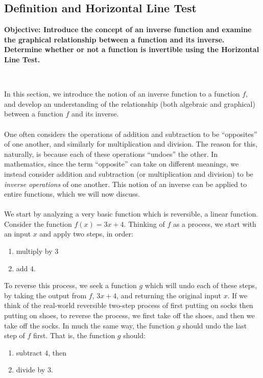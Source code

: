 \documentclass[11pt]{book}
\newcommand{\tmstrong}[1]{\textbf{#1}}
\theoremstyle{definition}  %
\newcommand{\pp}{\par~\par}
\begin{document}
\subsection{Definition and Horizontal Line Test}

{\tmstrong{Objective: Introduce the concept of an inverse function and examine the graphical relationship between a function and its inverse.  Determine whether or not a function is invertible using the Horizontal Line Test.}}\pp

In this section, we introduce the notion of an inverse function to a function $f$, and develop an understanding of the relationship (both algebraic and graphical) between a function $f$ and its inverse.\\
~\\
One often considers the operations of addition and subtraction to be ``opposites'' of one another, and similarly for multiplication and division.  The reason for this, naturally, is because each of these operations ``undoes'' the other.  In mathematics, since the term ``opposite'' can take on different meanings, we instead consider addition and subtraction (or multiplication and division) to be \textit{inverse operations} of one another.  This notion of an inverse can be applied to entire functions, which we will now discuss.\\
~\\
We start by analyzing a very basic function which is reversible, a linear function.  Consider the function $f(x) = 3x+4$.  Thinking of $f$ as a process, we start with an input $x$ and apply two steps, in order: 

\begin{enumerate}
	\item multiply by $3$ 
	\item add $4$. 
\end{enumerate}

To reverse this process, we seek a function $g$ which will undo each of these steps, by taking the output from $f$, $3x+4$, and returning the original input $x$.  If we think of the real-world reversible two-step process of first putting on socks then putting on shoes, to reverse the process, we first take off the shoes, and then we take off the socks.    In much the same way, the function $g$ should undo the last step of $f$ first.  That is, the function $g$ should:

\begin{enumerate}
	\item subtract  $4$, then 
	\item divide by $3$. 
\end{enumerate}
\end{document}
